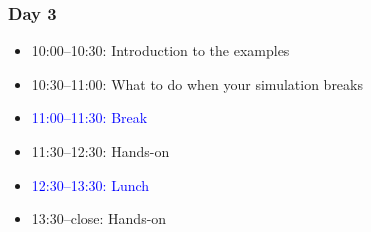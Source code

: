 
\begin{frame}
  \frametitle{Day 3}
  \begin{itemize}[]
  \item[] 10:00--10:30: Introduction to the examples
  \item[] 10:30--11:00: What to do when your simulation breaks
  \item[] \textcolor{blue}{11:00--11:30: Break}
  \item[] 11:30--12:30: Hands-on
  \item[] \textcolor{blue}{12:30--13:30: Lunch}
  \item[] 13:30--close: Hands-on
  \end{itemize}
\end{frame}
